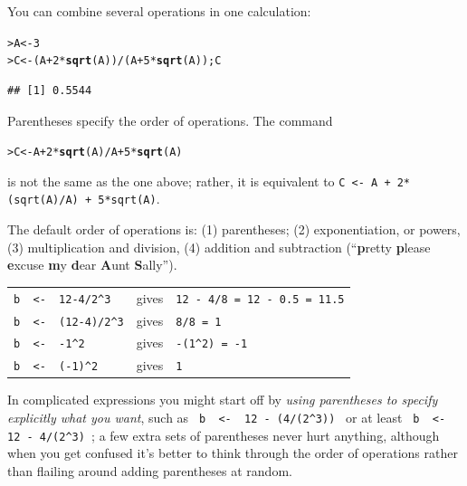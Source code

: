 \documentclass[11pt]{article}\usepackage[]{graphicx}\usepackage[]{color}
\makeatletter
\newcommand{\hlnum}[1]{\textcolor[rgb]{0.686,0.059,0.569}{#1}}%
\newcommand{\hlopt}[1]{\textcolor[rgb]{0,0,0}{#1}}%
\newcommand{\hlstd}[1]{\textcolor[rgb]{0.345,0.345,0.345}{#1}}%
\newcommand{\hlkwb}[1]{\textcolor[rgb]{0.69,0.353,0.396}{#1}}%
\newcommand{\hlkwd}[1]{\textcolor[rgb]{0.737,0.353,0.396}{\textbf{#1}}}%
\newenvironment{kframe}{%
 \def\at@end@of@kframe{}%
 \ifinner\ifhmode%
  \def\at@end@of@kframe{\end{minipage}}%
  \begin{minipage}{\columnwidth}%
 \fi\fi%
 \def\FrameCommand##1{\hskip\@totalleftmargin \hskip-\fboxsep
 \colorbox{shadecolor}{##1}\hskip-\fboxsep
     \hskip-\linewidth \hskip-\@totalleftmargin \hskip\columnwidth}%
 \MakeFramed {\advance\hsize-\width
   \@totalleftmargin\z@ \linewidth\hsize
   \@setminipage}}%
 {\par\unskip\endMakeFramed%
 \at@end@of@kframe}
\newenvironment{knitrout}{}{} %
\newcommand{\code}[1]{{\tt #1}}
\numberwithin{exercise}{section}
\makeatother
\begin{document}
You can combine several operations in one calculation:
\begin{knitrout}
\color{fgcolor}\begin{kframe}
\begin{alltt}
\hlstd{> }\hlstd{A} \hlkwb{<-} \hlnum{3}
\hlstd{> }\hlstd{C} \hlkwb{<-} \hlstd{(A} \hlopt{+} \hlnum{2} \hlopt{*} \hlkwd{sqrt}\hlstd{(A))} \hlopt{/} \hlstd{(A} \hlopt{+} \hlnum{5} \hlopt{*} \hlkwd{sqrt}\hlstd{(A)); C}
\end{alltt}
\begin{verbatim}
## [1] 0.5544
\end{verbatim}
\end{kframe}
\end{knitrout}
\noindent Parentheses specify the order of operations. 
The command
\begin{knitrout}
\color{fgcolor}\begin{kframe}
\begin{alltt}
\hlstd{> }\hlstd{C} \hlkwb{<-} \hlstd{A} \hlopt{+} \hlnum{2} \hlopt{*} \hlkwd{sqrt}\hlstd{(A)} \hlopt{/} \hlstd{A} \hlopt{+} \hlnum{5} \hlopt{*} \hlkwd{sqrt}\hlstd{(A)}
\end{alltt}
\end{kframe}
\end{knitrout}
\noindent is not the same as the one above; rather, it is 
equivalent to \code{C <- A + 2*(sqrt(A)/A) + 5*sqrt(A)}.

The default order of operations is: (1) parentheses; 
(2) exponentiation, or powers, (3) multiplication 
and division, (4) addition and subtraction (``\textbf{p}retty \textbf{p}lease
\textbf{e}xcuse \textbf{m}y \textbf{d}ear \textbf{A}unt \textbf{S}ally'').

\begin{tabular}{lcl}
\verb!b  <-  12-4/2^3! & gives  & \verb!12 - 4/8 = 12 - 0.5 = 11.5! \\
\verb!b  <-  (12-4)/2^3! & gives & \verb!8/8 = 1! \\
\verb!b  <-  -1^2!   &          gives  &  \verb!-(1^2) = -1! \\
\verb!b  <-  (-1)^2! &          gives  &  \verb!1!
\end{tabular} 

In complicated expressions 
you might start off by \emph{using parentheses to specify 
explicitly what you want}, such as \verb! b  <-  12 - (4/(2^3)) ! 
or at least \verb! b  <-  12 - 4/(2^3) !; a few extra sets of parentheses
never hurt anything, although when you get confused
it's better to think through the order of operations rather than flailing
around adding parentheses at random.
\end{document}
